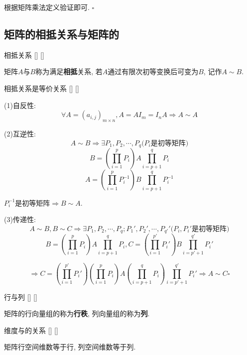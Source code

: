 \documentclass[UTF8]{ctexart}
\begin{document}
        \begin{prf}
			根据矩阵乘法定义验证即可. $\square$
	    \end{prf}
 
	\subsection{矩阵的相抵关系与矩阵的\秩}
	
		\begin{dfn}
			[]
			{相抵关系}
			[]
			[]

			矩阵$A$与$B$称为满足\textbf{相抵}关系, 若$A$通过有限次初等变换后可变为$B$, 记作$A\sim B$. 
		\end{dfn}
		
		\begin{ppt}
			[]
			{相抵关系是等价关系}
			[]
			[]

		\end{ppt}
  
		\begin{prf}
			(1)自反性: 
				\[\forall A=(a_{i,j})_{m\times n}, A=AI_m=I_nA\Longrightarrow A\sim A\]
			
			(2)互逆性: 
				\[A\sim B\Longrightarrow\exists P_1,P_2,\cdots, P_q\text{($P_i$是初等矩阵)}\]
				\[B=(\prod_{i=1}^{p}P_i)A\prod_{i=p+1}^qP_{i}\]
				\[A=(\prod_{i=1}^{p}P_i^{-1})B\prod_{i=p+1}^qP_{i}^{-1}\]
				
				$P_i^{-1}$是初等矩阵$\Longrightarrow B\sim A$. 
				
			(3)传递性: 
				\[A\sim B, B\sim C\Longrightarrow\exists P_1,P_2,\cdots,P_q;P_1',P_2',\cdots,P_{q'}'\textbf{($P_i,P_i'$是初等矩阵)}\] 
				\[B=(\prod_{i=1}^{p}P_i)A\prod_{i=p+1}^qP_{i}, C=(\prod_{i=1}^{p'}P_i')B\prod_{i=p'+1}^{q'}P_i'\]
				
				\[\Longrightarrow C=(\prod_{i=1}^{p'}P_i')(\prod_{i=1}^{p}P_i)A(
                \prod_{i=p+1}^qP_{i})\prod_{i=p'+1}^{q'}P_i'\Longrightarrow A\sim C\square\]
		\end{prf}
  
		\begin{dfn}
			[]
			{行\秩 与列\秩}
			[]
			[]

			矩阵的行向量组的\秩 称为\textbf{行秩}, 列向量组的\秩 称为\textbf{列\秩}. 
		\end{dfn}
		
		\begin{ppt}
			[]
			{维度与\秩 的关系}
			[]
			[]

			矩阵行空间维数等于行\秩, 列空间维数等于列\秩. 
		\end{ppt}
  
\end{document}
